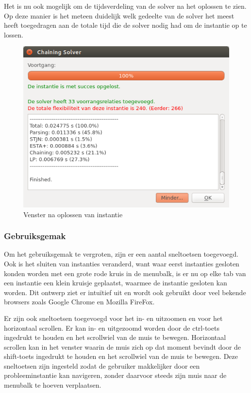 Het is nu ook mogelijk om de tijdsverdeling van de solver na het oplossen te zien. Op deze manier is het meteen duidelijk welk gedeelte van de solver het meest heeft toegedragen aan de totale tijd die de solver nodig had om de instantie op te lossen.

\begin{figure}[H]
    \center
    \includegraphics[width=.7\textwidth]{../images/solver-dialog.png}
    \caption{Venster na oplossen van instantie}
    \label{fig:solver-dialog}
\end{figure}

\subsubsection{Gebruiksgemak}
\label{sec:gebruiksgemak}
Om het gebruiksgemak te vergroten, zijn er een aantal sneltoetsen toegevoegd. Ook is het sluiten van instanties veranderd, want waar eerst instanties gesloten konden worden met een grote rode kruis in de menubalk, is er nu op elke tab van een instantie een klein kruisje geplaatst, waarmee de instantie gesloten kan worden. Dit ontwerp ziet er intu\"itief uit en wordt ook gebruikt door veel bekende browsers zoals Google Chrome en Mozilla FireFox.

Er zijn ook sneltoetsen toegevoegd voor het in- en uitzoomen en voor het horizontaal scrollen. Er kan in- en uitgezoomd worden door de ctrl-toets ingedrukt te houden en het scrollwiel van de muis  te bewegen. Horizontaal scrollen kan in het venster waarin de muis zich op dat moment bevindt door de shift-toets ingedrukt te houden en het scrollwiel van de muis te bewegen. Deze sneltoetsen zijn ingesteld zodat de gebruiker makkelijker door een probleeminstantie kan navigeren, zonder daarvoor steeds zijn muis naar de menubalk te hoeven verplaatsen.

